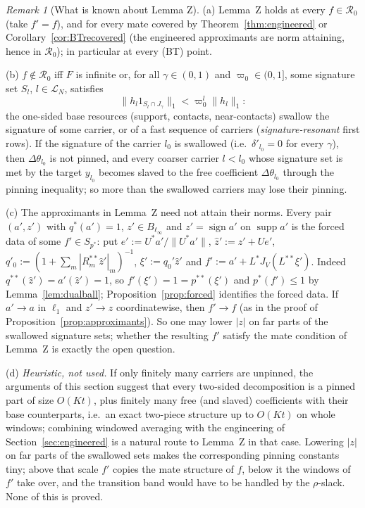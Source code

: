 \documentclass[10pt]{amsart}
\theoremstyle{definition}
\theoremstyle{remark}
\newtheorem{remark}[theorem]{Remark}
\newcommand{\supp}{\operatorname{supp}}
\newcommand{\sgn}{\operatorname{sign}}
\newcommand{\zh}{\hat z}
\begin{document}
\begin{remark}[What is known about Lemma Z]\label{rem:lemmaZ}
(a) Lemma~Z holds at every $f\in\mathcal R_0$ (take $f'=f$), and for every
mate covered by Theorem~\ref{thm:engineered} or
Corollary~\ref{cor:BTrecovered} (the engineered approximants are norm
attaining, hence in $\mathcal R_0$); in particular at every \textup{(BT)}
point.

(b) $f\notin\mathcal R_0$ iff $F$ is infinite or, for all $\gamma\in(0,1)$
and $\varpi_0\in(0,1]$, some signature set $S_l$, $l\in\mathcal L_N$,
satisfies
\[
 \|h_l1_{S_l\cap J_\gamma}\|_1<\varpi_0^l\|h_l\|_1 :
\]
the one-sided base resources (support, contacts,
near-contacts) swallow the signature of some carrier, or of a fast sequence
of carriers (\emph{signature-resonant} first rows).  If the signature of the
carrier $l_0$ is swallowed (i.e.\ $\delta'_{l_0}=0$ for every
$\gamma$), then $\Delta\theta_{l_0}$ is not
pinned, and every coarser carrier $l<l_0$ whose signature set is met by the
target $y_{l_0}$ becomes slaved to the free coefficient $\Delta\theta_{l_0}$
through the pinning inequality; so more than the swallowed carriers may
lose their pinning.

(c) The approximants in Lemma~Z need not attain their norms.  Every pair
$(a',z')$ with $q^*(a')=1$, $z'\in B_{\ell_\infty}$ and $z'=\sgn a'$ on
$\supp a'$ is the forced data of some $f'\in S_{p^*}$: put
$e':=U^*a'/\|U^*a'\|$, $\zh':=z'+Ue'$, $q'_0:=(1+\sum_m|R^{**}_m\zh'|_m)^{-1}$,
$\xi':=q_0'\zh'$ and $f':=a'+L^*J_V(L^{**}\xi')$.  Indeed $q^{**}(\zh')=
a'(\zh')=1$, so $f'(\xi')=1=p^{**}(\xi')$ and $p^*(f')\le1$ by
Lemma~\ref{lem:dualball}; Proposition~\ref{prop:forced} identifies the
forced data.  If $a'\to a$ in $\ell_1$ and $z'\to z$ coordinatewise, then
$f'\to f$ (as in the proof of Proposition~\ref{prop:approximants}).  So one
may lower $|z|$ on far parts of the swallowed signature sets; whether the
resulting $f'$ satisfy the mate condition of Lemma~Z is exactly the open
question.

(d) \emph{Heuristic, not used.}  If only finitely many carriers are unpinned,
the arguments of this section suggest that every two-sided decomposition is a
pinned part of size $O(Kt)$, plus finitely many free (and slaved)
coefficients with their base counterparts, i.e.\ an exact two-piece
structure up to $O(Kt)$ on whole windows; combining windowed averaging with
the engineering of Section~\ref{sec:engineered} is a natural route to
Lemma~Z in that case.  Lowering $|z|$ on far parts of the swallowed sets
makes the corresponding pinning constants tiny; above that scale $f'$
copies the mate structure of $f$, below it the windows of $f'$ take over,
and the transition band would have to be handled by the $\rho$-slack.
None of this is proved.


\end{remark}
\end{document}

